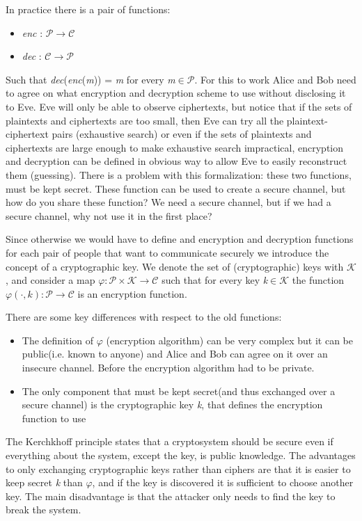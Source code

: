 In practice there is a pair of functions:
\begin{itemize}
	\item \emph{enc} : $\mathcal{P \rightarrow C}$
	\item \emph{dec} : $\mathcal{C \rightarrow P}$
\end{itemize}
Such that \emph{dec}(\emph{enc}(\emph{m})) = \emph{m} for every \emph{m}$\in$$\mathcal{P}$.
For this to work Alice and Bob need to agree on what encryption and decryption scheme to use without disclosing it to Eve. Eve will only be able to observe ciphertexts, but notice that if the sets of plaintexts and ciphertexts are too small, then Eve can try all the plaintext-ciphertext pairs (exhaustive search) or even if the sets of plaintexts and ciphertexts are large enough to make exhaustive search impractical, encryption and decryption can be defined in obvious way to allow Eve to easily reconstruct them (guessing).
There is a problem with this formalization: these two functions, must be kept secret. These function can be used to create a secure channel, but how do you share these function? We need a secure channel, but if we had a secure channel, why not use it in the first place?

Since otherwise we would have to define and encryption and decryption functions for each pair of people that want to communicate securely we introduce the concept of a cryptographic key. We denote the set of (cryptographic) keys with $\mathcal{K}$, and consider a map 
$\varphi : \mathcal{P} \times \mathcal{K} \rightarrow \mathcal{C}$ such that for every key \emph{k}$\in$$\mathcal{K}$ the function $\varphi(\cdot, k) : \mathcal{P} \rightarrow \mathcal{C}$ is an encryption function.

There are some key differences with respect to the old functions:
\begin{itemize}
	\item The definition of $\varphi$ (encryption algorithm) can be very complex but it can be public(i.e. known to anyone) and Alice and Bob can agree on it over an insecure channel. Before the encryption algorithm had to be private.
	\item The only component that must be kept secret(and thus exchanged over a secure channel) is the cryptographic key \emph{k}, that defines the encryption function to use
\end{itemize}

The Kerchkhoff principle states that a cryptosystem should be secure even if everything about the system, except the key, is public knowledge. The advantages to only exchanging cryptographic keys rather than ciphers are that it is easier to keep secret \emph{k} than $\varphi$, and if the key is discovered it is sufficient to choose another key. The main disadvantage is that the attacker only needs to find the key to break the system.


